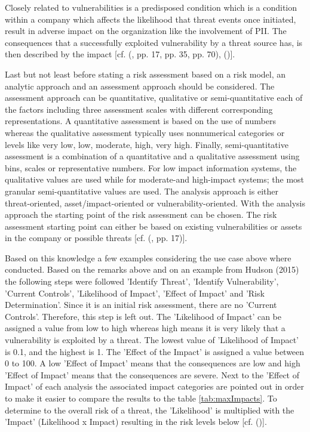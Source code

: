 Closely related to vulnerabilities is a predisposed condition which is a condition within a company which affects the likelihood that threat events once initiated, result in adverse impact on the organization like the involvement of PII. The consequences that a successfully exploited vulnerability by a threat source has, is then described by the impact  [cf. (\cite{NIST:2012:GCRA}, pp. 17, pp. 35, pp. 70), (\cite{NIST:2017:SecurityNPrivacyControls})].

Last but not least before stating a risk assessment based on a risk model, an analytic approach and an assessment approach should be considered. The assessment approach can be quantitative, qualitative or semi-quantitative each of the factors including three assessment scales with different corresponding representations. A quantitative assessment is based on the use of numbers whereas the qualitative assessment typically uses nonnumerical categories or levels like very low, low, moderate, high, very high. Finally, semi-quantitative assessment is a combination of a quantitative and a qualitative assessment using bins, scales or representative numbers. For low impact information systems, the qualitative values are used while for moderate-and high-impact systems; the most granular semi-quantitative values are used. The analysis approach is either threat-oriented, asset/impact-oriented or vulnerability-oriented. With the analysis approach the starting point of the risk assessment can be chosen. The risk assessment starting point can either be based on existing vulnerabilities or assets in the company or possible threats  [cf. (\cite{NIST:2012:GCRA}, pp. 17)].

Based on this knowledge a few examples considering the use case above where conducted. Based on the remarks above and on an example from Hudson (2015) the following steps were followed  'Identify Threat', 'Identify Vulnerability', 'Current Controls', 'Likelihood of Impact', 'Effect of Impact' and 'Risk Determination'. Since it is an initial risk assessment, there are no 'Current Controls'. Therefore, this step is left out. The 'Likelihood of Impact' can be assigned a value from low to high whereas high means it is very likely that a vulnerability is exploited by a threat. The lowest value of 'Likelihood of Impact' is 0.1, and the highest is 1. The 'Effect of the Impact' is assigned a value between 0 to 100. A low 'Effect of Impact' means that the consequences are low and high 'Effect of Impact' means that the consequences are severe. Next to the 'Effect of Impact' of each analysis the associated impact categories are pointed out in order to make it easier to compare the results to the table \ref{tab:maxImpacts}. To determine to the overall risk of a threat, the 'Likelihood' is multiplied with the 'Impact' (Likelihood x Impact) resulting in the risk levels below [cf. (\cite{Hudson:2015:SecurityRisk})]. 

